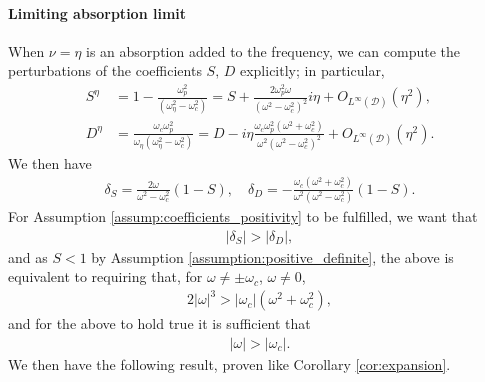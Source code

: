 \documentclass[report]{elsarticle}
\numberwithin{theorem}{section}
\begin{document}
\paragraph{Limiting absorption limit}
When $\nu=\eta$ is an absorption added to the frequency, we can compute the perturbations of the coefficients $S, \, D$ explicitly; in particular, 
\begin{align*}
	S^{\eta}&=1-\frac{\omega_p^2}{(\omega_{\eta}^2-\omega_c^2)}=S+\frac{2\omega_p^2\omega}{(\omega^2-\omega_c^2)^2}i\eta+O_{L^{\infty}(\mathcal{D})}(\eta^2),\\
	D^{\eta}&=\frac{\omega_c\omega_p^2}{\omega_{\eta}(\omega_{\eta}^2-\omega_c^2)}=D-i\eta \frac{\omega_c\omega_p^2(\omega^2+\omega_c^2)}{\omega^2(\omega^2-\omega_c^2)^2}
+O_{L^{\infty}(\mathcal{D})}(\eta^2).
\end{align*}
We then have 
\begin{align}
	\label{eq:deltaseta}
	\delta_S=\frac{2\omega}{\omega^2-\omega_c^2}\left(1-S\right), \quad \delta_D=-\frac{\omega_c(\omega^2+\omega_c^2)}{\omega^2(\omega^2-\omega_c^2)}\left(1-S\right). 
\end{align}
For Assumption \ref{assump:coefficients_positivity} to be fulfilled, we want that 
\begin{align*}
	|\delta_S|>|\delta_D|,
\end{align*}
and as $S<1$ by Assumption \ref{assumption:positive_definite}, the above is equivalent to requiring that, for $\omega\neq \pm \omega_c$,  $\omega\neq 0$,
\begin{align*}
2|\omega|^3>|\omega_c|(\omega^2+\omega_c^2),
\end{align*}
and for the above to hold true it is sufficient that 
\begin{align*}
	|\omega|>|\omega_c|. 
\end{align*}
We then have the following result, proven like Corollary \ref{cor:expansion}.
\end{document}
